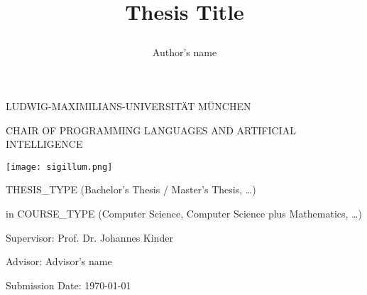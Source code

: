\documentclass[thesis]{plai}
\title{
    \begin{center}
        \bfseries\LARGE
        Thesis Title
    \end{center}
}
\author{
    \begin{center}
        \large
        Author's name
    \end{center}
}
\date{\relax}
\begin{document}


\begin{center}
    \uppercase{Ludwig-Maximilians-Universität München}
\end{center}

\begin{center}
    \uppercase{Chair of Programming Languages and Artificial Intelligence}
\end{center}

\vspace*{10mm}

\begin{center}
    \texttt{[image: sigillum.png]}
\end{center}

\vspace*{10mm}

{\let\newpage\relax\maketitle}

\thispagestyle{empty}

\begin{center}
    \begin{large}
        \begin{Large}
            THESIS\_TYPE (Bachelor's Thesis / Master's Thesis, \ldots)\\
        \end{Large}
        in COURSE\_TYPE (Computer Science, Computer Science plus Mathematics, \ldots)\\
    \end{large}
\end{center}

\vspace{1cm}

\begin{center}
    \begin{large}
        Supervisor: Prof. Dr. Johannes Kinder\\
    \end{large}
\end{center}

\begin{center}
    \begin{large}
        Advisor: Advisor's name\\
    \end{large}
\end{center}


\begin{center}
    \begin{large}
        Submission Date: \today{}\\
    \end{large}
\end{center}
\end{document}
